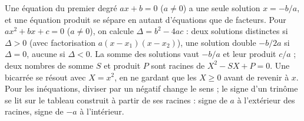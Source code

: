 \begin{aretirer}
Une équation du premier degré $ax + b = 0$ ($a \neq 0$) a une seule solution $x = -b/a$, et une équation produit se sépare en autant d'équations que de facteurs. Pour $ax^{2} + bx + c = 0$ ($a \neq 0$), on calcule $\Delta = b^{2} - 4ac$ : deux solutions distinctes si $\Delta > 0$ (avec factorisation $a(x - x_{1})(x - x_{2})$), une solution double $-b/2a$ si $\Delta = 0$, aucune si $\Delta < 0$. La somme des solutions vaut $-b/a$ et leur produit $c/a$ ; deux nombres de somme $S$ et produit $P$ sont racines de $X^{2} - S X + P = 0$. Une bicarrée se résout avec $X = x^{2}$, en ne gardant que les $X \geqslant 0$ avant de revenir à $x$. Pour les inéquations, diviser par un négatif change le sens ; le signe d'un trinôme se lit sur le tableau construit à partir de ses racines : signe de $a$ à l'extérieur des racines, signe de $-a$ à l'intérieur.
\end{aretirer}
